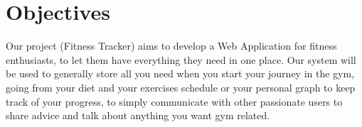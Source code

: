 \section{Objectives}


Our project (Fitness Tracker) aims to develop a Web Application for fitness enthusiasts, to let them have everything they need in one place.
Our system will be used to generally store all you need when you start your journey in the gym, going from your diet and your exercises schedule or your personal graph to keep track of your progress, to simply communicate with other passionate users to share advice and talk about anything you want gym related. 